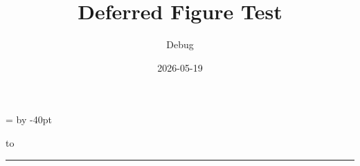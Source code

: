 \documentclass[a4paper,11pt]{article}
\title{Deferred Figure Test}
\author{Debug}
\date{2026-05-19}
\begin{document}
\maketitle

\newdimen\testht
\testht=\textheight
\advance\testht by -40pt

\vbox to\testht{%
  \lipsum[1-4]%
  \vss
}%

\begin{swarmwrap}%
  \begin{minipage}[t]{3cm}
    \centering
    \rule{\linewidth}{8cm}
  \end{minipage}%
\end{swarmwrap}%
\swarmwrapnext
\lipsum[1-3]
\end{document}
